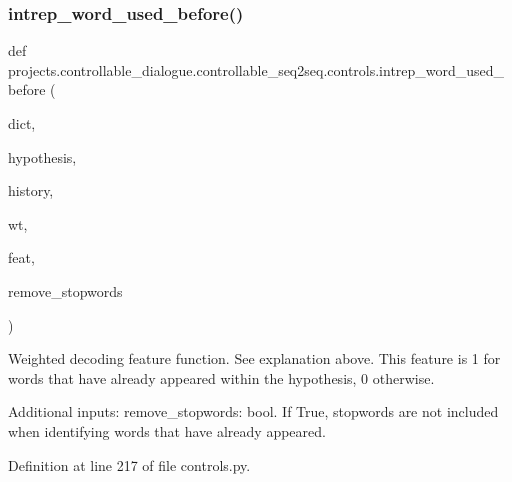 \subsubsection{\texorpdfstring{intrep\+\_\+word\+\_\+used\+\_\+before()}{intrep\_word\_used\_before()}}
{\footnotesize\ttfamily def projects.\+controllable\+\_\+dialogue.\+controllable\+\_\+seq2seq.\+controls.\+intrep\+\_\+word\+\_\+used\+\_\+before (\begin{DoxyParamCaption}\item[{}]{dict,  }\item[{}]{hypothesis,  }\item[{}]{history,  }\item[{}]{wt,  }\item[{}]{feat,  }\item[{}]{remove\+\_\+stopwords }\end{DoxyParamCaption})}

\begin{DoxyVerb}Weighted decoding feature function. See explanation above. This feature is 1 for
words that have already appeared within the hypothesis, 0 otherwise.

Additional inputs:
  remove_stopwords: bool. If True, stopwords are not included when identifying words
    that have already appeared.
\end{DoxyVerb}
 

Definition at line 217 of file controls.\+py.


